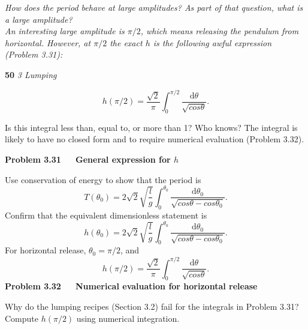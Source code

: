 \documentclass[a4paper, 11pt]{book}
\begin{document}
\it {How does the period behave at large amplitudes? As part of that question, what
is a large amplitude?}\\


\rm An interesting large amplitude is $\pi/2$, which means releasing the pendulum
from horizontal. However, at $\pi/2$ the exact $h$ is the following awful
expression (Problem 3.31):

\newpage
\large\textbf{50} \hfill \textit{3 Lumping} \\
\vspace{0pt}

\begin{equation}
h\left ( \pi /2 \right )= \frac{\sqrt{2}}{\pi }\int_{0}^{\pi /2}\frac{\mathrm{d} \theta }{\sqrt{cos\theta }}.
\end{equation}

Is this integral less than, equal to, or more than 1? Who knows? The integral
is likely to have no closed form and to require numerical evaluation
(Problem 3.32).

\vspace{10pt}

\colorbox{light-gray}{
\begin{minipage}{\textwidth}

\textbf{Problem 3.31~~~General expression for $h$}

Use conservation of energy to show that the period is
\begin{equation}
T(\theta _{0})=2\sqrt{2}\sqrt{\frac{l}{g}}\int_{0}^{\theta _{0}}\frac{\mathrm{d} \theta _{0}}{\sqrt{cos\theta -cos\theta _{0}}}.
\end{equation}
Confirm that the equivalent dimensionless statement is
\begin{equation}
h(\theta _{0})=2\sqrt{2}\sqrt{\frac{l}{g}}\int_{0}^{\theta _{0}}\frac{\mathrm{d} \theta _{0}}{\sqrt{cos\theta -cos\theta _{0}}}.
\end{equation}
For horizontal release, $\theta _{0}=\pi/2$, and
\begin{equation}
h\left ( \pi /2 \right )= \frac{\sqrt{2}}{\pi }\int_{0}^{\pi /2}\frac{\mathrm{d} \theta }{\sqrt{cos\theta }}.
\end{equation}
\textbf{Problem 3.32~~~Numerical evaluation for horizontal release}

Why do the lumping recipes (Section 3.2) fail for the integrals in Problem 3.31?
Compute $h(\pi/2)$ using numerical integration.

\end{minipage} }
\vspace{5pt}
\end{document}
